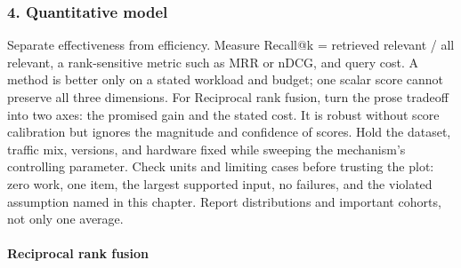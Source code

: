 \subsubsection*{4. Quantitative model}
Separate effectiveness from efficiency. Measure Recall@k = retrieved relevant / all relevant, a rank-sensitive metric such as MRR or nDCG, and query cost. A method is better only on a stated workload and budget; one scalar score cannot preserve all three dimensions.
For Reciprocal rank fusion, turn the prose tradeoff into two axes: the promised gain and the stated cost. It is robust without score calibration but ignores the magnitude and confidence of scores. Hold the dataset, traffic mix, versions, and hardware fixed while sweeping the mechanism's controlling parameter.
Check units and limiting cases before trusting the plot: zero work, one item, the largest supported input, no failures, and the violated assumption named in this chapter. Report distributions and important cohorts, not only one average.
\paragraph{Reciprocal rank fusion}
